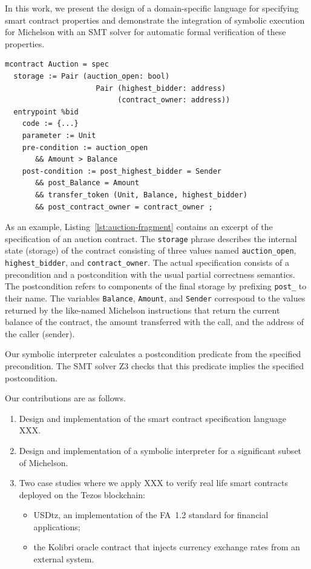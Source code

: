 \documentclass[a4paper,USenglish,cleveref, autoref, thm-restate]{lipics-v2021}
\begin{document}
In this work, we present the design of a domain-specific language for
specifying smart contract properties and demonstrate the integration
of symbolic execution for Michelson with an SMT solver for automatic
formal verification of these properties.

\begin{lstlisting}[float=tp,captionpos=b,caption={Auction contract specification (excerpt)},label={lst:auction-fragment}]
mcontract Auction = spec 
  storage := Pair (auction_open: bool) 
                     Pair (highest_bidder: address)
                          (contract_owner: address))
  entrypoint %bid
    code := {...}
    parameter := Unit 
    pre-condition := auction_open 
       && Amount > Balance
    post-condition := post_highest_bidder = Sender 
       && post_Balance = Amount 
       && transfer_token (Unit, Balance, highest_bidder) 
       && post_contract_owner = contract_owner ;
\end{lstlisting}
As an example, Listing~\ref{lst:auction-fragment} contains an excerpt
of the specification of an auction contract. The \texttt{storage}
phrase describes the internal state (storage) of the contract
consisting of three values named \lstinline|auction_open|,
\lstinline|highest_bidder|, and \lstinline|contract_owner|.
The actual specification consists of a precondition and a
postcondition with the usual partial correctness semantics. The
postcondition refers to components of the final storage by prefixing
\lstinline|post_| to their name. The variables \lstinline|Balance|,
\lstinline|Amount|, and \lstinline|Sender| correspond to the values
returned by the like-named Michelson instructions that return the
current balance of the contract, the amount transferred with the call,
and the address of the caller (sender).

Our symbolic interpreter calculates a postcondition predicate from the specified
precondition. The SMT solver Z3 \cite{Z3} checks that this predicate
implies the specified postcondition.

Our contributions are as follows.
\begin{enumerate}
\item Design and implementation of the smart contract specification
  language XXX.
\item Design and implementation of a symbolic interpreter for a
  significant subset of Michelson.
\item Two case studies where we apply XXX to verify real life smart
  contracts deployed on the Tezos blockchain:
  \begin{itemize}
  \item USDtz, an implementation of the FA~1.2 standard for financial
    applications;
  \item the Kolibri oracle contract that injects currency exchange
    rates from an external system.
  \end{itemize}
\end{enumerate}
\end{document}
